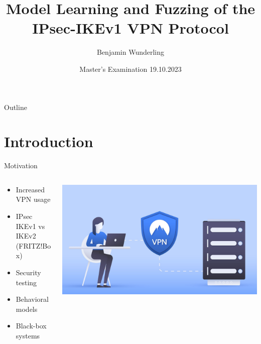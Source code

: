 \documentclass[aspectratio=169, xcolor=table]{beamer}
\title[Model Learning and Fuzzing of the IPsec-IKEv1 VPN Protocol]{Model Learning and Fuzzing of the \\ IPsec-IKEv1 VPN Protocol}
\author{Benjamin Wunderling}
\date{Master's Examination 19.10.2023}
\institute{}
\begin{document}
\begin{frame}[plain]
  \maketitle
\end{frame}


\begin{frame}{Outline}
  \vspace{-1.5em}
  \tableofcontents
\end{frame}


\section{Introduction}

\begin{frame}{Motivation}
	\vspace{-1.5em}
	\begin{columns}[T]
		\begin{column}{0.6\textwidth}
			\begin{itemize}
				\item Increased VPN usage
				\pause
				\item IPsec IKEv1 vs IKEv2 (FRITZ!Box)
				\pause
				\item Security testing
				\pause
				\item Behavioral models
				\pause
				\item Black-box systems
			\end{itemize}
		\end{column}
		\begin{column}{0.4\textwidth}
			\includegraphics[width=1.0\textwidth]{images/vpn.jpg}
		\end{column}
	\end{columns}
\end{frame}
\end{document}

